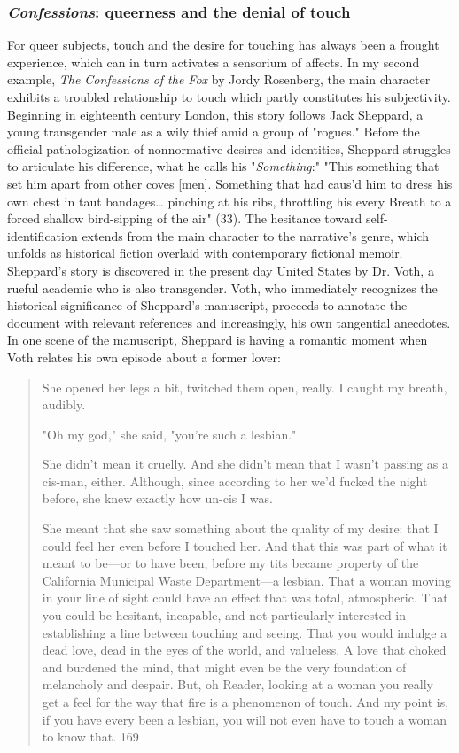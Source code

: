\documentclass[11pt]{article}
\begin{document}
\subsubsection{\emph{Confessions}: queerness and the denial of touch}
\label{sec:orga00aa5a}
For queer subjects, touch and the desire for touching has always been
a frought experience, which can in turn activates a sensorium of
affects. In my second example, \emph{The Confessions of the Fox} by Jordy
Rosenberg, the main character exhibits a troubled relationship to
touch which partly constitutes his subjectivity. Beginning in
eighteenth century London, this story follows Jack Sheppard, a young
transgender male as a wily thief amid a group of "rogues."  Before the
official pathologization of nonnormative desires and identities,
Sheppard struggles to articulate his difference, what he calls his
"\emph{Something}:" "This something that set him apart from other coves
[men]. Something that had caus'd him to dress his own chest in taut
bandages\ldots{} pinching at his ribs, throttling his every Breath to a
forced shallow bird-sipping of the air" (33). The hesitance toward
self-identification extends from the main character to the narrative's
genre, which unfolds as historical fiction overlaid with contemporary
fictional memoir. Sheppard's story is discovered in the present day
United States by Dr. Voth, a rueful academic who is also
transgender. Voth, who immediately recognizes the historical
significance of Sheppard's manuscript, proceeds to annotate the
document with relevant references and increasingly, his own tangential
anecdotes. In one scene of the manuscript, Sheppard is having a
romantic moment when Voth relates his own episode about a former
lover:

\begin{quote}
She opened her legs a bit, twitched them open, really. I caught my
breath, audibly.

"Oh my god," she said, "you're such a lesbian."

She didn't mean it cruelly. And she didn't mean that I wasn't passing
as a cis-man, either. Although, since according to her we'd fucked the
night before, she knew exactly how un-cis I was. 

She meant that she saw something about the quality of my desire: that
I could feel her even before I touched her. And that this was part of
what it meant to be---or to have been, before my tits became property
of the California Municipal Waste Department---a lesbian. That a woman
moving in your line of sight could have an effect that was total,
atmospheric. That you could be hesitant, incapable, and not
particularly interested in establishing a line between touching and
seeing. That you would indulge a dead love, dead in the eyes of the
world, and valueless. A love that choked and burdened the mind, that
might even be the very foundation of melancholy and despair. But, oh
Reader, looking at a woman you really get a feel for the way that fire
is a phenomenon of touch. And my point is, if you have every been a
lesbian, you will not even have to touch a woman to know that. 169
\end{quote}
\end{document}
